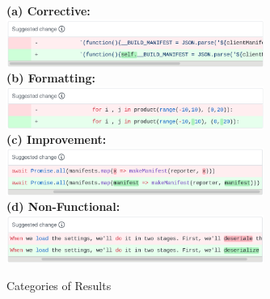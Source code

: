 \begin{figure}[!htbp]
\centering
    \textbf{(a) Corrective:}\\
     \includegraphics[width=0.75\textwidth]{Chapter-5/images/correct.png} \\
    \textbf{(b) Formatting:} \\
    \includegraphics[width=0.75\textwidth]{Chapter-5/images/format.png} \\
    \textbf{(c) Improvement:} \\
    \includegraphics[width=0.75\textwidth]{Chapter-5/images/improve.png} \\
    \textbf{(d) Non-Functional:} \\
    \includegraphics[width=0.75\textwidth]{Chapter-5/images/nonfunc.png}
     
    \caption{Categories of \sugg Results}    
    \label{fig:sugg-categories} 
\end{figure}